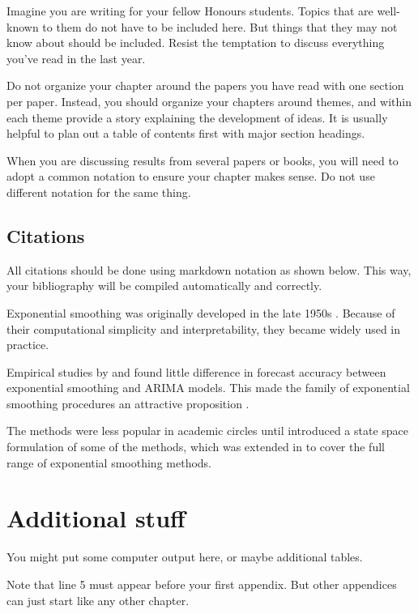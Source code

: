 \documentclass{monashthesis}
\begin{document}
Imagine you are writing for your fellow Honours students. Topics that
are well-known to them do not have to be included here. But things that
they may not know about should be included. Resist the temptation to
discuss everything you've read in the last year.

Do not organize your chapter around the papers you have read with one
section per paper. Instead, you should organize your chapters around
themes, and within each theme provide a story explaining the development
of ideas. It is usually helpful to plan out a table of contents first
with major section headings.

When you are discussing results from several papers or books, you will
need to adopt a common notation to ensure your chapter makes sense. Do
not use different notation for the same thing.

\section{Citations}\label{citations}

All citations should be done using markdown notation as shown below.
This way, your bibliography will be compiled automatically and
correctly.

Exponential smoothing was originally developed in the late 1950s
\autocites{Brown59}{Brown63}{Holt57}{Winters60}. Because of their
computational simplicity and interpretability, they became widely used
in practice.

Empirical studies by \textcite{MH79} and \textcite{Metal82} found little
difference in forecast accuracy between exponential smoothing and ARIMA
models. This made the family of exponential smoothing procedures an
attractive proposition \autocite[see][]{CKOS01}.

The methods were less popular in academic circles until \textcite{OKS97}
introduced a state space formulation of some of the methods, which was
extended in \textcite{HKSG02} to cover the full range of exponential
smoothing methods.

\appendix

\chapter{Additional stuff}\label{additional-stuff}

You might put some computer output here, or maybe additional tables.

Note that line 5 must appear before your first appendix. But other
appendices can just start like any other chapter.

\printbibliography[heading=bibintoc]
\end{document}
